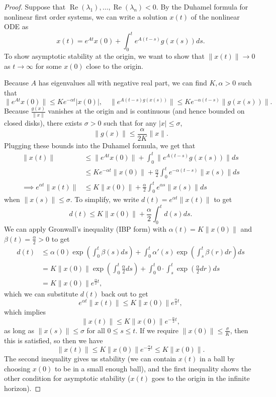 \documentclass{tufte-handout}
\theoremstyle{definition}
\begin{document}
\begin{proof}
	 Suppose that $\operatorname{Re}\left(\lambda_1\right),\ldots,\operatorname{Re}\left(\lambda_n\right) < 0$. By the Duhamel formula for nonlinear first order systems, we can write a solution $x(t)$ of the nonlinear ODE as \[
		x(t) = e^{At}x(0) + \int_{0}^{t} e^{A(t-s)}g(x(s))ds 
	.\] To show asymptotic stability at the origin, we want to show that $\|x(t)\|\to 0$ as $t\to \infty$ for some $x(0)$ close to the origin.

	Because $A$ has eigenvalues all with negative real part, we can find $K, \alpha > 0$ such that \[
		\|e^{At} x(0)\| \le Ke^{-\alpha t} \left| x(0) \right|, \quad \|e^{A(t-s)g(x(s))}\| \le Ke^{-\alpha(t-s)} \|g(x(s))\|
	.\] Because $\frac{g(x)}{\|x\|}$ vanishes at the origin and is continuous (and hence bounded on closed disks), there exists $\sigma > 0$ such that for any $\left| x \right| \le \sigma$, \[
		\|g(x)\| \le \frac{\alpha}{2K} \|x\|
	.\] Plugging these bounds into the Duhamel formula, we get that
	\begin{align*}
		\|x(t)\| &\le \|e^{At} x(0)\| + \int_{0}^{t} \|e^{A(t-s)}g(x(s))\|ds \\ 
				 &\le Ke^{-\alpha t}\|x(0)\| + \frac{\alpha}{2} \int_{0}^{t} e^{-\alpha(t-s)}\|x(s)\|ds \\
		\implies e^{\alpha t} \|x(t)\| &\le K \|x(0)\| + \frac{\alpha}{2} \int_{0}^{t} e^{\alpha s}\|x(s)\| ds
	\end{align*}
	when $\|x(s)\| \le \sigma$. To simplify, we write $d(t) = e^{\alpha t} \|x(t)\|$ to get \[
		d(t) \le K \|x(0)\| + \frac{\alpha}{2 } \int_{0}^{t} d(s)ds 
		.\] We can apply Gronwall's inequality (IBP form) with $\alpha(t) = K \|x(0)\|$ and $\beta(t) = \frac{\alpha}{2} > 0$ to get \begin{align*}
		d(t) &\le \alpha(0) \operatorname{\exp}\left(\int_{0}^{t} \beta(s)ds\right) + \int_{0}^{t} \alpha'(s) \operatorname{exp}\left(\int_{s}^{t} \beta(r)dr\right) ds  \\
			 &= K \|x\left(0 \right)\|\operatorname{exp}\left(\int_{0}^{t} \frac{\alpha}{2} ds\right) + \int_{0}^{t} 0 \cdot \int_{s}^{t} \operatorname{exp}\left(\frac{\alpha}{2}dr \right)ds  \\
			 &= K\|x(0)\|e^{\frac{\alpha}{2}t} 
	,\end{align*}
	which we can substitute $d(t)$ back out to get \[
		e^{\alpha t} \|x(t)\| \le K \|x(0)\|e^{\frac{\alpha}{2}t}
	,\] which implies \[
		\|x(t)\| \le K \|x(0)\|e^{-\frac{\alpha}{2}t}
	,\] as long as $\|x(s)\| \le \sigma$ for all $0 \le s \le t$. If we require $\|x(0)\| \le \frac{\sigma}{K}$, then this is satisfied, so then we have \[
		\|x(t)\| \le K \|x(0)\|e^{-\frac{\alpha}{2}t} \le K \|x(0)\|
	.\] The second inequality gives us stability (we can contain $x(t)$ in a ball by choosing $x(0)$ to be in a small enough ball), and the first inequality shows the other condition for asymptotic stability ($x(t)$ goes to the origin in the infinite horizon).


\end{proof}
\end{document}
